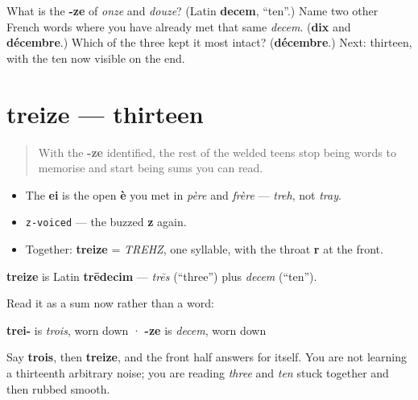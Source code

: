 \begin{tcolorbox}[breakable,colback=teal!4,colframe=teal!35!black,title={Before you move on}]
What is the \textbf{-ze} of \emph{onze} and \emph{douze}? (Latin \textbf{decem}, \textquotedblleft{}ten\textquotedblright{}.) Name two other French words where you have already met that same \emph{decem}. (\textbf{dix} and \textbf{décembre}.) Which of the three kept it most intact? (\textbf{décembre}.) Next: thirteen, with the ten now visible on the end.
\end{tcolorbox}
\section[treize]{treize — thirteen}

\label{lesson:FR-C12-treize}



\begin{quote}
With the \textbf{-ze} identified, the rest of the welded teens stop being words to memorise and start being sums you can read.
\end{quote}

\begin{sounds}
\begin{itemize}
\raggedright
  \item The \textbf{ei} is the open \textbf{è} you met in \emph{père} and \emph{frère} — \emph{treh}, not \emph{tray}.
  \item \texttt{z-voiced} — the buzzed \textbf{z} again.
  \item Together: \textbf{treize} = \emph{TREHZ}, one syllable, with the throat \textbf{r} at the front.
\end{itemize}
\end{sounds}

\begin{cousinweb}
\textbf{treize} is Latin \textbf{trēdecim} — \emph{trēs} (\textquotedblleft{}three\textquotedblright{}) plus \emph{decem} (\textquotedblleft{}ten\textquotedblright{}).

Read it as a sum now rather than a word:

\textbf{trei-} is \emph{trois}, worn down · \textbf{-ze} is \emph{decem}, worn down

Say \textbf{trois}, then \textbf{treize}, and the front half answers for itself. You are not learning a thirteenth arbitrary noise; you are reading \emph{three} and \emph{ten} stuck together and then rubbed smooth.
\end{cousinweb}


